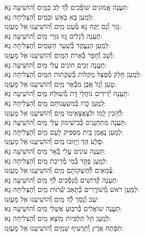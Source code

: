 \documentclass[twoside, openany, parskip=half, 11pt]{book}
\begin{document}
\begin{small}
תַּעֲנֶה אֱמוּנִים שׁוֹפְ֯כִים לְ֯ךָ לֵב כַּמַּֽיִם \hfill וְ֯הוֹשִֽׁיעָה נָּא:\\
לְמַֽעַן בָּא בָאֵשׁ וּבַמַּֽיִם \hfill וְ֯הַצְלִיחָה נָא: \\
גָּזַר וְ֯נָם יֻקַּח נָא מְ֯עַט מַֽיִם \hfill וְ֯הוֹשִׁיעֵֽנוּ אֵל מָעֻזֵּֽנוּ:\\
תַּעֲנֶה דְ֯גָלִים גָּֽזוּ גִּזְרֵי מַֽיִם \hfill וְ֯הוֹשִֽׁיעָה נָּא:\\
לְמַֽעַן הַנֶּעֱקַד בְּ֯שַֽׁעַר הַשָּׁמַֽיִם \hfill וְ֯הַצְלִיחָה נָא:\\
וְ֯שָׁב וְ֯חָפַר בְּ֯אֵרֹת הַמַּֽיִם \hfill וְ֯הוֹשִׁיעֵֽנוּ אֵל מָעֻזֵּֽנוּ:\\
תַּעֲנֶה זַכִּים חוֹנִים עֲלֵי מַֽיִם \hfill וְ֯הוֹשִֽׁיעָה נָּא:\\
לְמַֽעַן חָלָק מְ֯פַצֵּל מַקְלוֹת בְּ֯שִׁקֲתוֹת הַמַּֽיִם \hfill וְ֯הַצְלִיחָה נָא:\\
טָעַן וְ֯גָל אֶֽבֶן מִבְּ֯אֵר מַֽיִם \hfill וְ֯הוֹשִׁיעֵֽנוּ אֵל מָעֻזֵּֽנוּ:\\
תַּעֲנֶה יְ֯דִידִים נוֹחֲלֵי דָת מְ֯שֽׁוּלַת מַֽיִם \hfill וְ֯הוֹשִֽׁיעָה נָּא: \\
לְמַֽעַן כָּרוּ בְּ֯מִשְׁעֲנוֹתָם מַֽיִם \hfill וְ֯הַצְלִיחָה נָא:\\
לְ֯הָכִין לָֽמוֹ וּלְצֶאֱצָאֵֽימוֹ מַֽיִם \hfill וְ֯הוֹשִׁיעֵֽנוּ אֵל מָעֻזֵּֽנוּ:\\
תַּעֲנֶה מִתְחַנֲּנִים כְּ֯בִישִׁימוֹן עֲלֵי מַֽיִם \hfill וְ֯הוֹשִֽׁיעָה נָּא:\\
לְמַֽעַן נֶאֱמַן בַּֽיִת מַסְפִּיק לָעָם מַֽיִם \hfill וְ֯הַצְלִיחָה נָא:\\
סֶלַע הָךְ וַיָזֽוּבוּ מַֽיִם \hfill וְ֯הוֹשִׁיעֵֽנוּ אֵל מָעֻזֵּֽנוּ: \\
תַּעֲנֶה עוֹנִים עֲלִי בְ֯אֵר מַֽיִם \hfill וְ֯הוֹשִֽׁיעָה נָּא: \\
לְמַֽעַן פֻּקַּד בְּ֯מֵי מְ֯רִֽיבַת מַֽיִם \hfill וְ֯הַצְלִיחָה נָא:\\
צְ֯מֵאִים לְ֯הַשְׁקוֹתָם מַֽיִם \hfill וְ֯הוֹשִׁיעֵֽנוּ אֵל מָעֻזֵּנוּ: \\
תַּעֲנֶה קְ֯דוֹשִׁים מְ֯נַסְּ֯כִים לְ֯ךָ מַֽיִם \hfill וְ֯הוֹשִֽׁיעָה נָּא: \\
לְמַֽעַן רֹאשׁ מְ֯שׁוֹרֲרִים כְּ֯תָאַב שְׁ֯תוֹת מַֽיִם \hfill וְ֯הַצְלִיחָה נָא:\\
שָׁב וְ֯נָסַךְ לְ֯ךָ מַֽיִם \hfill וְ֯הוֹשִׁיעֵֽנוּ אֵל מָעֻזֵּֽנוּ:\\
תַּעֲנֶה שׁוֹאֲלִים בְּ֯רִבּֽוּעַ אֶשְׁלֵי מַֽיִם \hfill וְ֯הוֹשִֽׁיעָה נָּא: \\
לְמַֽעַן תֵּל תַּלְפִּיוֹת מֽוֹצָא מַֽיִם \hfill וְ֯הַצְלִיחָה נָא:\\
תִּפְתַּח אֶֽרֶץ וְ֯תַרְעִיף שָׁמַֽיִם \hfill וְ֯הוֹשִׁיעֵֽנוּ אֵל מָעֻזֵּֽנוּ:

\end{small}
\end{document}
